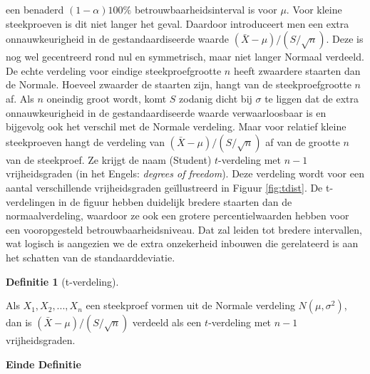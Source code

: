 \documentclass[
  12pt,dutch]{book}
\theoremstyle{definition}
\newtheorem{definition}{Definitie}[chapter]
\theoremstyle{definition}
\theoremstyle{definition}
\theoremstyle{definition}
\theoremstyle{remark}
\begin{document}
een benaderd \((1- \alpha)100\%\) betrouwbaarheidsinterval is voor \(\mu\). Voor
kleine steekproeven is dit niet langer het geval. Daardoor introduceert men
een extra onnauwkeurigheid in de gestandaardiseerde waarde \({(\bar{X} - \mu)}/{(S/\sqrt{n})}\). Deze is nog wel gecentreerd rond nul en symmetrisch, maar niet langer Normaal verdeeld. De echte verdeling voor eindige
steekproefgrootte \(n\) heeft zwaardere staarten dan de Normale. Hoeveel
zwaarder de staarten zijn, hangt van de steekproefgrootte \(n\) af. Als \(n\)
oneindig groot wordt, komt \(S\) zodanig dicht bij \(\sigma\) te liggen dat de
extra onnauwkeurigheid in de gestandaardiseerde waarde verwaarloosbaar is en
bijgevolg ook het verschil met de Normale verdeling. Maar voor relatief
kleine steekproeven hangt de verdeling van \({(\bar{X} - \mu)}/({S/\sqrt{n}})\) af van de grootte \(n\) van de steekproef. Ze krijgt de naam (Student) \(t\)-verdeling met \(n-1\) vrijheidsgraden (in het Engels: \emph{degrees of freedom}). Deze verdeling wordt voor een aantal verschillende vrijheidsgraden geïllustreerd in Figuur \ref{fig:tdist}.
De t-verdelingen in de figuur hebben duidelijk bredere staarten dan de normaalverdeling, waardoor ze ook een grotere percentielwaarden hebben voor een vooropgesteld betrouwbaarheidsniveau.
Dat zal leiden tot bredere intervallen, wat logisch is aangezien we de extra onzekerheid inbouwen die gerelateerd is aan het schatten van de standaarddeviatie.

\begin{definition}[t-verdeling]
\protect\hypertarget{def:unnamed-chunk-150}{}\label{def:unnamed-chunk-150}~
\end{definition}

Als \(X_1, X_2, ..., X_n\) een steekproef vormen uit de Normale verdeling \(N(\mu, \sigma^2)\), dan is \((\bar{X} - \mu)/(S/\sqrt{n})\) verdeeld als een \(t\)-verdeling met \(n-1\) vrijheidsgraden.

\textbf{Einde Definitie}
\end{document}
